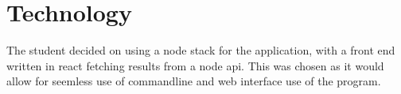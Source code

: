 \section{Technology}
The student decided on using a node stack for the application, with a front end written in react fetching results from a node api.
\newline
This was chosen as it would allow for seemless use of commandline and web interface use of the program.